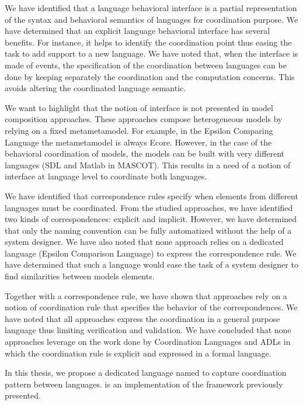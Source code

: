 We have identified that a language behavioral interface is a partial representation of the syntax and behavioral semantics of languages for coordination purpose. We have determined that an explicit language behavioral interface has several benefits. For instance, it helps to identify the coordination point thus easing the task to add support to a new language. We have noted that, when the interface is made of events, the specification of the coordination between languages can be done by keeping separately the coordination and the computation concerns. This avoids altering the coordinated language semantic.

We want to highlight that the notion of interface is not presented in model composition approaches. These approaches compose heterogeneous models by relying on a fixed metametamodel. For example, in the Epsilon Comparing Language the metametamodel is always Ecore. However, in the case of the behavioral coordination of models, the models can be built with very different languages (\eg SDL and Matlab in MASCOT). This results in a need of a notion of interface at language level to coordinate both languages.  

We have identified that correspondence rules specify when elements from different languages must be coordinated. From the studied approaches, we have identified two kinds of correspondences: explicit and implicit. However, we have determined that only the naming convention can be fully automatized without the help of a system designer. We have also noted that none approach relies on a dedicated language (\eg Epsilon Comparison Language) to express the correspondence rule. We have determined that such a language would ease the task of a system designer to find similarities between models elements.  

Together with a correspondence rule, we have shown that approaches rely on a notion of coordination rule that specifies the behavior of the correspondences. We have noted that all approaches express the coordination in a general purpose language thus limiting verification and validation. We have concluded that none approaches leverage on the work done by Coordination Languages and ADLs in which the coordination rule is explicit and expressed in a formal language.  

In this thesis, we propose a dedicated language named \bcool to capture coordination pattern between languages. \bcool is an implementation of the framework previously presented.  

